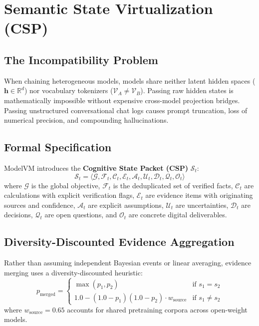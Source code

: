 \documentclass[10pt,twocolumn]{article}
\begin{document}
\section{Semantic State Virtualization (CSP)}

\subsection{The Incompatibility Problem}
When chaining heterogeneous models, models share neither latent hidden spaces ($\mathbf{h} \in \mathbb{R}^d$) nor vocabulary tokenizers ($\mathcal{V}_A \neq \mathcal{V}_B$). Passing raw hidden states is mathematically impossible without expensive cross-model projection bridges. Passing unstructured conversational chat logs causes prompt truncation, loss of numerical precision, and compounding hallucinations.

\subsection{Formal Specification}
ModelVM introduces the \textbf{Cognitive State Packet (CSP)} $\mathcal{S}_t$:
\begin{equation}
\mathcal{S}_t = \langle \mathcal{G}, \mathcal{F}_t, \mathcal{C}_t, \mathcal{E}_t, \mathcal{A}_t, \mathcal{U}_t, \mathcal{D}_t, \mathcal{Q}_t, \mathcal{O}_t \rangle
\end{equation}
where $\mathcal{G}$ is the global objective, $\mathcal{F}_t$ is the deduplicated set of verified facts, $\mathcal{C}_t$ are calculations with explicit verification flags, $\mathcal{E}_t$ are evidence items with originating sources and confidence, $\mathcal{A}_t$ are explicit assumptions, $\mathcal{U}_t$ are uncertainties, $\mathcal{D}_t$ are decisions, $\mathcal{Q}_t$ are open questions, and $\mathcal{O}_t$ are concrete digital deliverables.

\subsection{Diversity-Discounted Evidence Aggregation}
Rather than assuming independent Bayesian events or linear averaging, evidence merging uses a diversity-discounted heuristic:
\begin{equation}
p_{\text{merged}} = \begin{cases} 
\max(p_1, p_2) & \text{if } s_1 = s_2 \\
1.0 - (1.0 - p_1)(1.0 - p_2) \cdot w_{\text{source}} & \text{if } s_1 \neq s_2
\end{cases}
\end{equation}
where $w_{\text{source}} = 0.65$ accounts for shared pretraining corpora across open-weight models.
\end{document}
